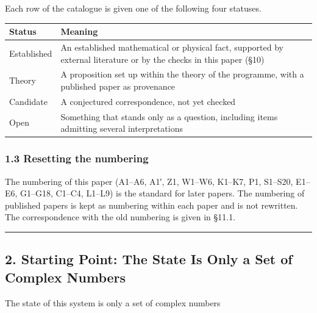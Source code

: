 \documentclass[
  a4paper,
]{article}
\newcounter{none} %
\begin{document}
Each row of the catalogue is given one of the following four statuses.

{\def\LTcaptype{none} %
\begin{longtable}[]{@{}
  >{\raggedright\arraybackslash}p{}
  >{\raggedright\arraybackslash}p{}@{}}
\toprule\noalign{}
\begin{minipage}[b]{\linewidth}\raggedright
Status
\end{minipage} & \begin{minipage}[b]{\linewidth}\raggedright
Meaning
\end{minipage} \\
\midrule\noalign{}
\endhead
\bottomrule\noalign{}
\endlastfoot
Established & An established mathematical or physical fact, supported by
external literature or by the checks in this paper (§10) \\
Theory & A proposition set up within the theory of the programme, with a
published paper as provenance \\
Candidate & A conjectured correspondence, not yet checked \\
Open & Something that stands only as a question, including items
admitting several interpretations \\
\end{longtable}
}

\subsubsection{1.3 Resetting the
numbering}\label{resetting-the-numbering}

The numbering of this paper (A1--A6, A1′, Z1, W1--W6, K1--K7, P1,
S1--S20, E1--E6, G1--G18, C1--C4, L1--L9) is the standard for later
papers. The numbering of published papers is kept as numbering within
each paper and is not rewritten. The correspondence with the old
numbering is given in §11.1.

\begin{center}\rule{0.5\linewidth}{0.5pt}\end{center}

\subsection{2. Starting Point: The State Is Only a Set of Complex
Numbers}\label{starting-point-the-state-is-only-a-set-of-complex-numbers}

The state of this system is only a set of complex numbers
\end{document}
